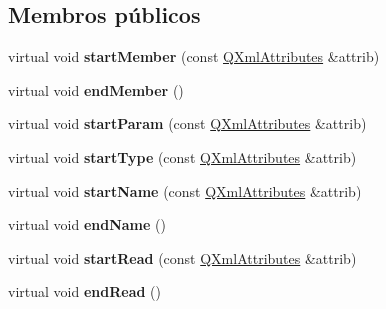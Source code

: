 \subsection*{Membros públicos}
\begin{DoxyCompactItemize}
\item 
\hypertarget{class_member_handler_a01468590a99c462fcde01bef28afdadf}{virtual void {\bfseries start\-Member} (const \hyperlink{class_q_xml_attributes}{Q\-Xml\-Attributes} \&attrib)}\label{class_member_handler_a01468590a99c462fcde01bef28afdadf}

\item 
\hypertarget{class_member_handler_aad5c72a5dfbeff28021ccce9a5c307cd}{virtual void {\bfseries end\-Member} ()}\label{class_member_handler_aad5c72a5dfbeff28021ccce9a5c307cd}

\item 
\hypertarget{class_member_handler_a0adc3c16cf5e35e11e1ef98e905b91e8}{virtual void {\bfseries start\-Param} (const \hyperlink{class_q_xml_attributes}{Q\-Xml\-Attributes} \&attrib)}\label{class_member_handler_a0adc3c16cf5e35e11e1ef98e905b91e8}

\item 
\hypertarget{class_member_handler_ae14fe251be3b5f4a32cd4cd60c4ff4f0}{virtual void {\bfseries start\-Type} (const \hyperlink{class_q_xml_attributes}{Q\-Xml\-Attributes} \&attrib)}\label{class_member_handler_ae14fe251be3b5f4a32cd4cd60c4ff4f0}

\item 
\hypertarget{class_member_handler_a96036f328d26533f71146ef58e6de87f}{virtual void {\bfseries start\-Name} (const \hyperlink{class_q_xml_attributes}{Q\-Xml\-Attributes} \&attrib)}\label{class_member_handler_a96036f328d26533f71146ef58e6de87f}

\item 
\hypertarget{class_member_handler_a868f8da2b2359477e050549430602266}{virtual void {\bfseries end\-Name} ()}\label{class_member_handler_a868f8da2b2359477e050549430602266}

\item 
\hypertarget{class_member_handler_a2a132b37d786cce0acb4143924da1381}{virtual void {\bfseries start\-Read} (const \hyperlink{class_q_xml_attributes}{Q\-Xml\-Attributes} \&attrib)}\label{class_member_handler_a2a132b37d786cce0acb4143924da1381}

\item 
\hypertarget{class_member_handler_a1143ed396d1273198dd270fd13a1d1fb}{virtual void {\bfseries end\-Read} ()}\label{class_member_handler_a1143ed396d1273198dd270fd13a1d1fb}


\end{DoxyCompactItemize}
